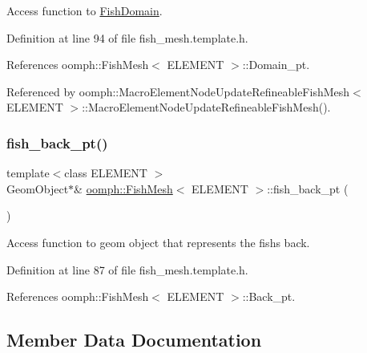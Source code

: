 Access function to \hyperlink{classoomph_1_1FishDomain}{Fish\+Domain}. 



Definition at line 94 of file fish\+\_\+mesh.\+template.\+h.



References oomph\+::\+Fish\+Mesh$<$ E\+L\+E\+M\+E\+N\+T $>$\+::\+Domain\+\_\+pt.



Referenced by oomph\+::\+Macro\+Element\+Node\+Update\+Refineable\+Fish\+Mesh$<$ E\+L\+E\+M\+E\+N\+T $>$\+::\+Macro\+Element\+Node\+Update\+Refineable\+Fish\+Mesh().

\mbox{\label{classoomph_1_1FishMesh_aa6d659caf657ce5fd549431fadb009d7}} 
\subsubsection{\texorpdfstring{fish\+\_\+back\+\_\+pt()}{fish\_back\_pt()}}
{\footnotesize\ttfamily template$<$class E\+L\+E\+M\+E\+NT $>$ \\
Geom\+Object$\ast$\& \hyperlink{classoomph_1_1FishMesh}{oomph\+::\+Fish\+Mesh}$<$ E\+L\+E\+M\+E\+NT $>$\+::fish\+\_\+back\+\_\+pt (\begin{DoxyParamCaption}{ }\end{DoxyParamCaption})\hspace{0.3cm}{\ttfamily [inline]}}



Access function to geom object that represents the fish\textquotesingle{}s back. 



Definition at line 87 of file fish\+\_\+mesh.\+template.\+h.



References oomph\+::\+Fish\+Mesh$<$ E\+L\+E\+M\+E\+N\+T $>$\+::\+Back\+\_\+pt.



\subsection{Member Data Documentation}
\mbox{\label{classoomph_1_1FishMesh_a26e8eb98c11d6b45cc3b5c5a8e45b530}} 
